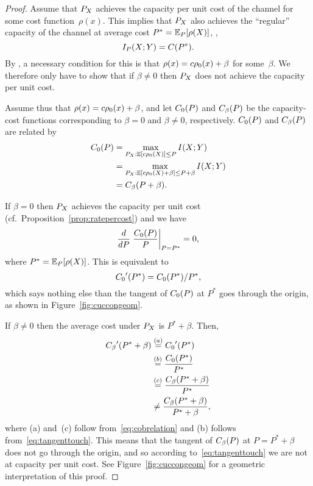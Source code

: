 \begin{proof}
  Assume that $P_X$ achieves the capacity per unit cost of the channel for some
  cost function~$\rho(x)$. This implies that $P_X$ also achieves the ``regular''
  capacity of the channel at average cost $P^* = \mathbb{E}_P[\rho(X)]$, \ie, 
  \[ I_P(X;Y) = C(P^*). \]
  By , a necessary condition for this is
  that $\rho(x) = c{\rho_0}(x) + \beta$ for some~$\beta$. We therefore only have to
  show that if $\beta \ne 0$ then $P_X$ does not achieve the capacity per unit
  cost. 

  Assume thus that $\rho(x) = c{\rho_0}(x) + \beta$, and let ${C_0}(P)$ and ${C_\beta}(P)$ be
  the capacity-cost functions corresponding to $\beta = 0$ and $\beta \ne 0$,
  respectively. ${C_0}(P)$ and ${C_\beta}(P)$ are related by
  \begin{align}
    {C_0}(P) &= \max_{P_X: \mathbb{E}[c{\rho_0}(X)] \le P} I(X;Y) \nonumber \\
    &= \max_{P_X: \mathbb{E}[c{\rho_0}(X) + \beta] \le P + \beta} I(X;Y) \nonumber \\
    &= {C_\beta}(P + \beta). \label{eq:cobrelation}
  \end{align}

  If $\beta = 0$ then $P_X$ achieves the capacity per unit cost (cf.\
  Proposition~\ref{prop:ratepercost}) and we have
  \begin{equation*}
    \frac{d}{dP} \left. \frac{{C_0}(P)}{P} \right|_{P=P^*} = 0,
  \end{equation*}
  where $P^* = \mathbb{E}_P[\rho(X)]$. This is equivalent to
  \begin{equation}
    \label{eq:tangenttouch}
    {C_0}'(P^*) = {C_0}(P^*)/P^*,
  \end{equation}
  which says nothing else than the tangent of ${C_0}(P)$ at $P^*$
  goes through the origin, as shown in Figure~\ref{fig:cuccongeom}.

  If $\beta \ne 0$ then the average cost under $P_X$ is $P^* + \beta$. Then,
  \begin{align*}
    {C_\beta}'(P^* + \beta) &\stackrel{(a)}{=} {C_0}'(P^*) \\
    &\stackrel{(b)}{=} \frac{{C_0}(P^*)}{P^*} \\
    &\stackrel{(c)}{=} \frac{{C_\beta}(P^*+\beta)}{P^*} \\
    &\ne \frac{{C_\beta}(P^* + \beta)}{P^* + \beta},
  \end{align*}
  where (a) and~(c) follow from~\eqref{eq:cobrelation} and (b) follows
  from~\eqref{eq:tangenttouch}.  This means that the tangent of ${C_\beta}(P)$ at
  $P = P^* + \beta$ does not go through the origin, and so according
  to~\eqref{eq:tangenttouch} we are not at capacity per unit cost.
  See Figure~\ref{fig:cuccongeom} for a geometric interpretation of this proof.
\end{proof}

